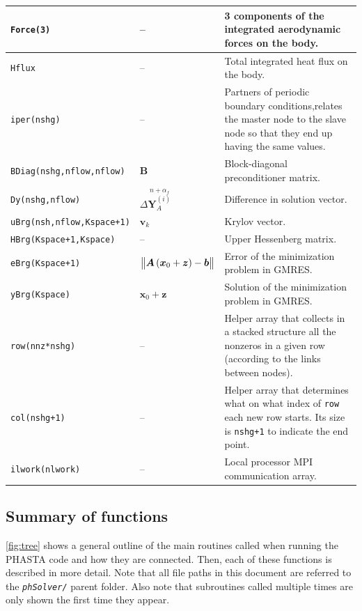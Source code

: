 \documentclass{ucb}
\begin{document}
\begin{longtable}[c]{m{} m{} m{}}
    \midrule
    \texttt{Force(3)} & -- & 3 components of the integrated aerodynamic forces on the body. \\
    \midrule
    \texttt{Hflux} & -- & Total integrated heat flux on the body. \\
    \midrule
    \texttt{iper(nshg)} & -- & Partners of periodic boundary conditions,relates the master node to the slave node so that they end up having the same values. \\
    \midrule
    \texttt{BDiag(nshg,nflow,nflow)} & $\bm{B}$ & Block-diagonal preconditioner matrix. \\
    \midrule
    \texttt{Dy(nshg,nflow)} & $\Delta\overset{n+\alpha_f}{\bm{Y}_A^{(i)}}$ & Difference in solution vector. \\
    \midrule
    \texttt{uBrg(nsh,nflow,Kspace+1)} & $\bm{v}_k$ & Krylov vector. \\
    \midrule
    \texttt{HBrg(Kspace+1,Kspace)} & -- & Upper Hessenberg matrix. \\
    \midrule
    \texttt{eBrg(Kspace+1)} & $\norm{\bm{A}\left(\bm{x}_0 + \bm{z}\right) - \bm{b}}$ & Error of the minimization problem in GMRES. \\
    \midrule
    \texttt{yBrg(Kspace)} & $\bm{x}_0 + \bm{z}$ & Solution of the minimization problem in GMRES. \\
    \midrule
    \texttt{row(nnz*nshg)} & -- & Helper array that collects in a stacked structure all the nonzeros in a given row (according to the links between nodes). \\
    \midrule
    \texttt{col(nshg+1)} & -- & Helper array that determines what on what index of \texttt{row} each new row starts. Its size is \texttt{nshg+1} to indicate the end point. \\
    \midrule
    \texttt{ilwork(nlwork)} & -- & Local processor MPI communication array. \\
    \bottomrule
\end{longtable}


\subsection{Summary of functions}

\autoref{fig:tree} shows a general outline of the main routines called when running the PHASTA code and how they are connected. Then, each of these functions is described in more detail. Note that all file paths in this document are referred to the \texttt{\textit{phSolver/}} parent folder. Also note that subroutines called multiple times are only shown the first time they appear.
\end{document}
